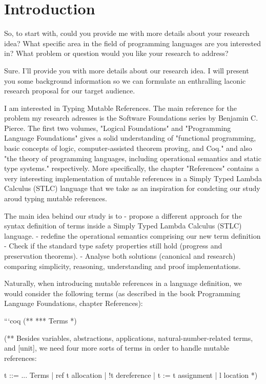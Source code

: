 
\chapter{Introduction}

So, to start with, could you provide me with more details about your research idea? What specific area in the field of programming languages are you interested in? What problem or question would you like your research to address?

Sure. I'll provide you with more details about our research idea. I will present you some background information so we can formulate an enthralling laconic research proposal for our target audience.

I am interested in Typing Mutable References. The main reference for the problem my research adresses is the Software Foundations series by Benjamin C. Pierce. The first two volumes, "Logical Foundations" and "Programming Language Foundations" gives a solid understanding of "functional programming, basic concepts of logic, computer-assisted theorem proving, and Coq." and also "the theory of programming languages, including operational semantics and static type systems." respectively. More specifically, the chapter "References" contains a very interesting implementation of mutable references in a Simply Typed Lambda Calculus (STLC) language that we take as an inspiration for condcting our study aroud typing mutable references.


The main idea behind our study is to
    - propose a different approach for the syntax definition of terms inside a Simply Typed Lambda Calculus (STLC) language.
    - redefine the operational semantics comprising our new term definition
    - Check if the standard type safety properties still hold (progress and preservation theorems).
    - Analyse both solutions (canonical and research) comparing simplicity, reasoning, understanding and proof implementations.


Naturally, when introducing mutable references in a language definition, we would consider the following terms (as described in the book Programming Language Foundations, chapter References):

```coq
(** *** Terms *)

(** Besides variables, abstractions, applications,
    natural-number-related terms, and [unit], we need four more sorts
    of terms in order to handle mutable references:

        t ::= ...              Terms
            | ref t              allocation
            | !t                 dereference
            | t := t             assignment
            | l                  location
*)

